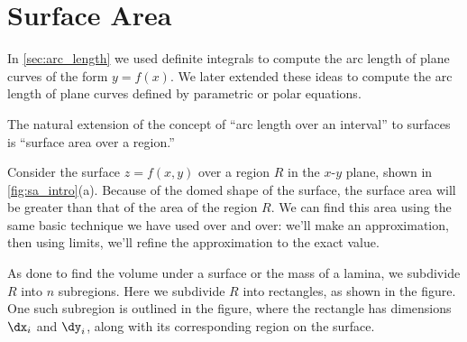 \section{Surface Area}\label{sec:surface_area}

In \autoref{sec:arc_length} we used definite integrals to compute the arc length of plane curves of the form $y=f(x)$. We later extended these ideas to compute the arc length of plane curves defined by parametric or polar equations. 

The natural extension of the concept of ``arc length over an interval'' to surfaces is ``surface area over a region.'' 

Consider the surface $z=f(x,y)$ over a region $R$ in the $x$-$y$ plane, shown in \autoref{fig:sa_intro}(a). Because of the domed shape of the surface, the surface area will be greater than that of the area of the region $R$. We can find this area using the same basic technique we have used over and over: we'll make an approximation, then using limits, we'll refine the approximation to the exact value.

As done to find the volume under a surface or the mass of a lamina, we subdivide $R$ into $n$ subregions. Here we subdivide $R$ into rectangles, as shown in the figure. One such subregion is outlined in the figure, where the rectangle has dimensions $\dx_i$ and $\dy_i$, along with its corresponding region on the surface.


